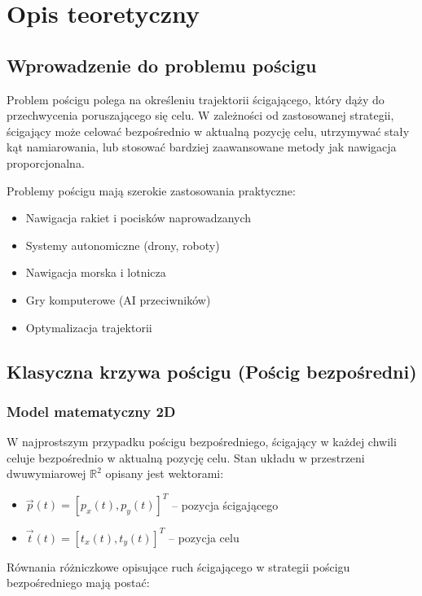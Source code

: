 \documentclass[12pt,a4paper]{article}
\begin{document}
\section{Opis teoretyczny}

\subsection{Wprowadzenie do problemu pościgu}

Problem pościgu polega na określeniu trajektorii ścigającego, który dąży do przechwycenia poruszającego się celu. W zależności od zastosowanej strategii, ścigający może celować bezpośrednio w aktualną pozycję celu, utrzymywać stały kąt namiarowania, lub stosować bardziej zaawansowane metody jak nawigacja proporcjonalna.

Problemy pościgu mają szerokie zastosowania praktyczne:
\begin{itemize}
    \item Nawigacja rakiet i pocisków naprowadzanych
    \item Systemy autonomiczne (drony, roboty)
    \item Nawigacja morska i lotnicza
    \item Gry komputerowe (AI przeciwników)
    \item Optymalizacja trajektorii
\end{itemize}

\subsection{Klasyczna krzywa pościgu (Pościg bezpośredni)}

\subsubsection{Model matematyczny 2D}

W najprostszym przypadku pościgu bezpośredniego, ścigający w każdej chwili celuje bezpośrednio w aktualną pozycję celu. Stan układu w przestrzeni dwuwymiarowej $\mathbb{R}^2$ opisany jest wektorami:

\begin{itemize}
    \item $\vec{p}(t) = [p_x(t), p_y(t)]^T$ -- pozycja ścigającego
    \item $\vec{t}(t) = [t_x(t), t_y(t)]^T$ -- pozycja celu
\end{itemize}

Równania różniczkowe opisujące ruch ścigającego w strategii pościgu bezpośredniego mają postać:
\end{document}

